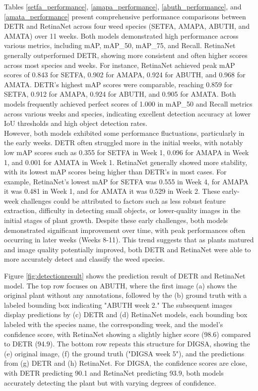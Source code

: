 Tables \ref{setfa_performance}, \ref{amapa_performance}, \ref{abuth_performance}, and \ref{amata_performance} present comprehensive performance comparisons between DETR and RetinaNet across four weed species (SETFA, AMAPA, ABUTH, and AMATA) over 11 weeks. Both models demonstrated high performance across various metrics, including mAP, mAP\_50, mAP\_75, and Recall. RetinaNet generally outperformed DETR, showing more consistent and often higher scores across most species and weeks. For instance, RetinaNet achieved peak mAP scores of 0.843 for SETFA, 0.902 for AMAPA, 0.924 for ABUTH, and 0.968 for AMATA. DETR's highest mAP scores were comparable, reaching 0.859 for SETFA, 0.912 for AMAPA, 0.924 for ABUTH, and 0.905 for AMATA. Both models frequently achieved perfect scores of 1.000 in mAP\_50 and Recall metrics across various weeks and species, indicating excellent detection accuracy at lower IoU thresholds and high object detection rates.\\
However, both models exhibited some performance fluctuations, particularly in the early weeks. DETR often struggled more in the initial weeks, with notably low mAP scores such as 0.355 for SETFA in Week 1, 0.096 for AMAPA in Week 1, and 0.001 for AMATA in Week 1. RetinaNet generally showed more stability, with its lowest mAP scores being higher than DETR's in most cases. For example, RetinaNet's lowest mAP for SETFA was 0.555 in Week 4, for AMAPA it was 0.481 in Week 1, and for AMATA it was 0.529 in Week 2. These early-week challenges could be attributed to factors such as less robust feature extraction, difficulty in detecting small objects, or lower-quality images in the initial stages of plant growth. Despite these early challenges, both models demonstrated significant improvement over time, with peak performances often occurring in later weeks (Weeks 8-11). This trend suggests that as plants matured and image quality potentially improved, both DETR and RetinaNet were able to more accurately detect and classify the weed species.


Figure \ref{fig:detectionresult} shows the prediction result of DETR and RetinaNet model. The top row focuses on ABUTH, where the first image (a) shows the original plant without any annotations, followed by the (b) ground truth with a labeled bounding box indicating "ABUTH week 2." The subsequent images display predictions by (c) DETR and (d) RetinaNet models, each bounding box labeled with the species name, the corresponding week, and the model's confidence score, with RetinaNet showing a slightly higher score (98.6) compared to DETR (94.9). The bottom row repeats this structure for DIGSA, showing the (e) original image, (f) the ground truth ("DIGSA week 5"), and the predictions from (g) DETR and (h) RetinaNet. For DIGSA, the confidence scores are close, with DETR predicting 90.1 and RetinaNet predicting 93.9, both models accurately detecting the plant but with varying degrees of confidence.